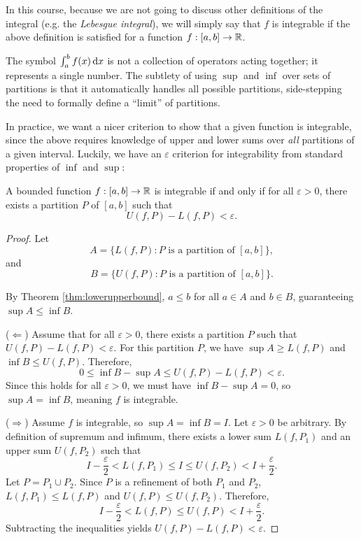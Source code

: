 \documentclass[../analysis1.tex]{subfiles}
\begin{document}
In this course, because we are not going to discuss other definitions of the integral (e.g. the \textit{Lebesgue integral}), we will simply say that $f$ is integrable if the above definition is satisfied for a function $f:[a,b]\to\mathbb{R}$.

\begin{remark}
    The symbol $\int_a^b f(x) \d{x}$ is not a collection of operators acting together; it represents a single number. The subtlety of using $\sup$ and $\inf$ over sets of partitions is that it automatically handles all possible partitions, side-stepping the need to formally define a ``limit'' of partitions.
\end{remark}

In practice, we want a nicer criterion to show that a given function is integrable, since the above requires knowledge of upper and lower sums over \textit{all} partitions of a given interval. Luckily, we have an $\varepsilon$ criterion for integrability from standard properties of $\inf$ and $\sup$:

\begin{theorem}
\label{thm:epsilonintegrability}
    \begin{shaded*}
        A bounded function $f: [a,b] \to \mathbb{R}$ is integrable if and only if for all $\varepsilon > 0$, there exists a partition $P$ of $[a,b]$ such that 
        \[
            U(f,P) - L(f,P) < \varepsilon.
        \]
    \end{shaded*}
\end{theorem}

\begin{proof}
    Let \[A = \{L(f,P) : P \text{ is a partition of } [a,b]\},\] and \[B = \{U(f,P) : P \text{ is a partition of } [a,b]\}.\]
    
    By Theorem \ref{thm:lowerupperbound}, $a \le b$ for all $a \in A$ and $b \in B$, guaranteeing $\sup A \le \inf B$.
    
    ($\Leftarrow$) Assume that for all $\varepsilon > 0$, there exists a partition $P$ such that $U(f,P) - L(f,P) < \varepsilon$. For this partition $P$, we have $\sup A \ge L(f,P)$ and $\inf B \le U(f,P)$. Therefore, 
    \[
        0 \le \inf B - \sup A \le U(f,P) - L(f,P) < \varepsilon.
    \]
    Since this holds for all $\varepsilon > 0$, we must have $\inf B - \sup A = 0$, so $\sup A = \inf B$, meaning $f$ is integrable.

    ($\Rightarrow$) Assume $f$ is integrable, so $\sup A = \inf B = I$. Let $\varepsilon > 0$ be arbitrary. By definition of supremum and infimum, there exists a lower sum $L(f, P_1)$ and an upper sum $U(f, P_2)$ such that
    \[
        I - \frac{\varepsilon}{2} < L(f, P_1) \le I \le U(f, P_2) < I + \frac{\varepsilon}{2}.
    \]
    Let $P = P_1 \cup P_2$. Since $P$ is a refinement of both $P_1$ and $P_2$, $L(f,P_1) \le L(f,P)$ and $U(f,P) \le U(f,P_2)$. Therefore,
    \[
        I - \frac{\varepsilon}{2} < L(f,P) \le U(f,P) < I + \frac{\varepsilon}{2}.
    \]
    Subtracting the inequalities yields $U(f,P) - L(f,P) < \varepsilon$.
\end{proof}
\end{document}
